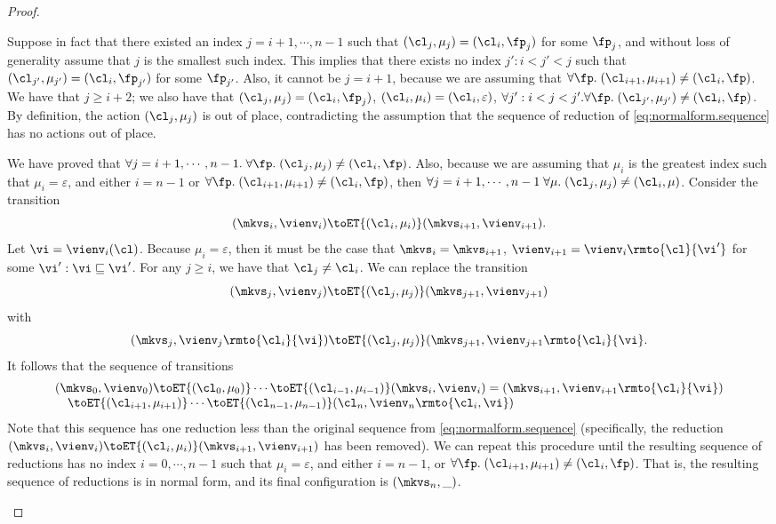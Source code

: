 \begin{proof}
\begin{enumerate}
Suppose in fact that there existed 
an index $j = i+1,\cdots, n-1$ such that $(\cl_{j}, \mu_{j}) = (\cl_{i}, \fp_{j})$ for some 
$\fp_{j}$, and without loss of generality assume that $j$ is the smallest such index. This implies that 
there exists no index $j': i < j' < j$ such that $(\cl_{j'}, \mu_{j'}) = (\cl_{i}, \fp_{j'})$ for some 
$\fp_{j'}$. Also, it cannot be $j = i+1$, because we are assuming that $\forall \fp.\;(\cl_{i+1}, \mu_{i+1}) \neq 
(\cl_{i}, \fp)$.  We have that $j \geq i+2$; we also have that  $(\cl_{j}, \mu_{j}) = (\cl_{i}, \fp_{j})$, 
$(\cl_{i}, \mu_{i}) = (\cl_{i}, \varepsilon)$, $\forall j': i < j < j'.\forall \fp.\; (\cl_{j'}, \mu_{j'}) \neq (\cl_{i}, \fp)$. 
By definition, the action $(\cl_{j}, \mu_{j})$ is out of place, contradicting the assumption that the sequence of 
reduction of \cref{eq:normalform.sequence} has no actions out of place.

We have proved that $\forall j = i+1, \cdots, n-1.\;\forall \fp.\;(\cl_{j}, \mu_{j}) \neq (\cl_{i}, \fp)$. 
Also, because we are assuming that $\mu_{i}$ is the greatest index such that $\mu_{i} = \varepsilon$, 
and either $i= n-1$ or $\forall \fp.\;(\cl_{i+1},\mu_{i+1}) \neq (\cl_{i}, \fp)$, 
then $\forall j=i+1,\cdots, n-1\;\forall \mu.\;(\cl_{j}, \mu_{j}) \neq (\cl_{i}, \mu)$. 
Consider the transition 
\[
(\mkvs_{i}, \vienv_{i}) \toET{(\cl_{i}, \mu_{i})} (\mkvs_{i+1}, \vienv_{i+1}).
\]
Let $\vi = \vienv_{i}(\cl)$. Because $\mu_{i} = \varepsilon$, then it must be the case that 
$\mkvs_{i} = \mkvs_{i+1}$, $\vienv_{i+1} = \vienv_{i}\rmto{\cl}{\vi'}$ for some $\vi' : \vi \sqsubseteq \vi'$. 
For any $j \geq i$, we have that $\cl_{j} \neq \cl_{i}$. We can replace the transition 
\[
(\mkvs_{j}, \vienv_{j}) \toET{(\cl_{j}, \mu_{j})} (\mkvs_{j+1}, \vienv_{j+1})
\]
with 
\[
(\mkvs_{j}, \vienv_{j}\rmto{\cl_{i}}{\vi}) \toET{(\cl_{j}, \mu_{j})} (\mkvs_{j+1}, \vienv_{j+1}\rmto{\cl_{i}}{\vi}.
\]
It follows that the sequence of transitions 
\[ 
\begin{array}{@{}l@{}}
(\mkvs_{0}, \vienv_{0}) \toET{(\cl_{0}, \mu_{0})} \cdots \toET{(\cl_{i-1},\mu_{i-1})} 
(\mkvs_{i}, \vienv_{i}) = (\mkvs_{i+1}, \vienv_{i+1}\rmto{\cl_{i}}{\vi})  \\
\quad \toET{(\cl_{i+1}, \mu_{i+1})} \cdots 
\toET{(\cl_{n-1}, \mu_{n-1})} (\cl_{n}, \vienv_{n}\rmto{\cl_{i}, \vi})
\end{array}
\]
Note that this sequence has one reduction less than the original sequence from \eqref{eq:normalform.sequence} (specifically, 
the reduction $(\mkvs_{i}, \vienv_{i}) \toET{(\cl_{i}, \mu_{i})} (\mkvs_{i+1}, \vienv_{i+1})$ has 
been removed). We can repeat this procedure until the resulting sequence of reductions has no index $i=0,\cdots, n-1$ such that  
$\mu_{i} = \varepsilon$, and either $i = n-1$, or 
$\forall \fp.\; (\cl_{i+1}, \mu_{i+1}) \neq (\cl_{i}, \fp)$. That is, the resulting sequence of reductions is in normal form, 
and its final configuration is $(\mkvs_{n}, \_)$.


\end{enumerate}
\end{proof}

